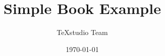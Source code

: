 \documentclass[a4paper,12pt]{book}
\begin{document}
\author{TeXstudio Team}
\title{Simple Book Example}
\date{\today}

\frontmatter
\maketitle
\tableofcontents

\mainmatter







\backmatter


\end{document}

